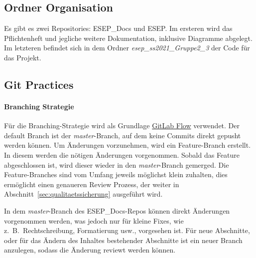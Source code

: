 
\subsection{Ordner Organisation}\label{subsec:organisation}
Es gibt es zwei Repositories: ESEP\_Docs und ESEP. Im ersteren wird das Pflichtenheft und
jegliche weitere Dokumentation, inklusive Diagramme abgelegt. Im letzteren befindet sich in dem
Ordner \textit{esep\_ss2021\_Gruppe2\_3} der Code für das Projekt.

\subsection{Git Practices}\label{subsec:git}

\paragraph{Branching Strategie}
Für die Branching-Strategie wird als Grundlage
\href{https://docs.gitlab.com/ee/topics/gitlab_flow.html}{GitLab Flow} verwendet.
Der default Branch ist der \textit{master}-Branch, auf dem keine Commits direkt
gepusht werden können.
Um Änderungen vorzunehmen, wird ein Feature-Branch erstellt.
In diesem werden die nötigen Änderungen vorgenommen.
Sobald das Feature abgeschlossen ist, wird dieser wieder in den \textit{master}-Branch gemerged.
Die Feature-Branches sind vom Umfang jeweils möglichst klein zuhalten, dies ermöglicht einen
genaueren Review Prozess, der weiter in Abschnitt~\ref{sec:qualitaetssicherung} ausgeführt wird.

In dem \textit{master}-Branch des ESEP\_Docs-Repos können direkt Änderungen vorgenommen werden,
was jedoch nur für kleine Fixes, wie  z.\ B.\ Rechtschreibung, Formatierung usw., vorgesehen ist.
Für neue Abschnitte, oder für das Ändern des Inhaltes bestehender Abschnitte ist ein neuer Branch
anzulegen, sodass die Änderung reviewt werden können.

